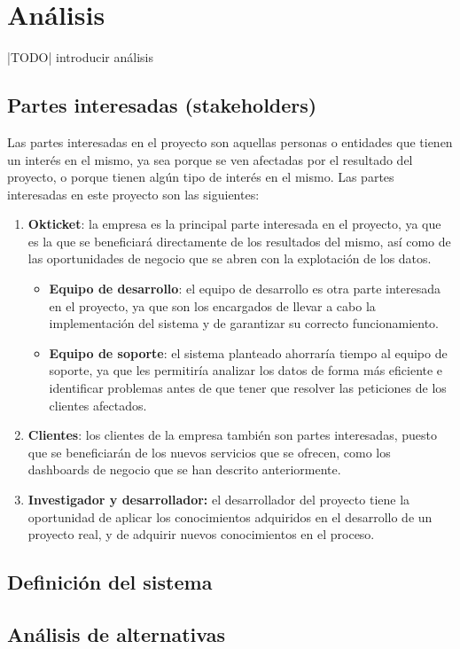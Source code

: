 \chapter{Análisis}\label{chap:analisis}
|TODO| introducir análisis
\section{Partes interesadas (stakeholders)}\label{sec:stakeholders}
Las partes interesadas en el proyecto son aquellas personas o entidades que tienen un interés
en el mismo, ya sea porque se ven afectadas por el resultado del proyecto, o porque tienen
algún tipo de interés en el mismo. Las partes interesadas en este proyecto son las siguientes:

\begin{enumerate}
	\item \textbf{Okticket}: la empresa es la principal parte interesada en el proyecto, ya que
		es la que se beneficiará directamente de los resultados del mismo, así como de las
		oportunidades de negocio que se abren con la explotación de los datos.
		\begin{itemize}
			\item \textbf{Equipo de desarrollo}: el equipo de desarrollo es otra parte interesada en el
				proyecto, ya que son los encargados de llevar a cabo la implementación del sistema y
				de garantizar su correcto funcionamiento.
			\item \textbf{Equipo de soporte}: el sistema planteado ahorraría tiempo al equipo de
				soporte, ya que les permitiría analizar los datos de forma más eficiente e identificar
				problemas antes de que tener que resolver las peticiones de los clientes afectados.
		\end{itemize}
	\item \textbf{Clientes}: los clientes de la empresa también son partes interesadas, puesto
		que se beneficiarán de los nuevos servicios que se ofrecen, como los dashboards de
		negocio que se han descrito anteriormente.
	\item \textbf{Investigador y desarrollador:} el desarrollador del proyecto tiene la oportunidad de
		aplicar los conocimientos adquiridos en el desarrollo de un proyecto real, y de adquirir
		nuevos conocimientos en el proceso.
\end{enumerate}

\section{Definición del sistema}\label{sec:definicion}

\section{Análisis de alternativas}\label{sec:alternativas}
